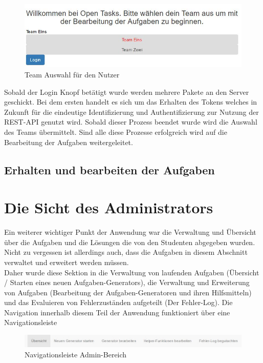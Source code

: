 \begin{figure}[htp]     %
\centering
\includegraphics[width=1\textwidth]{bilder/UserLogin} 
\caption[Login für den Nutzer / Teamauswahl]{Team Auswahl für den Nutzer}
\end{figure} 

Sobald der Login Knopf betätigt wurde werden mehrere Pakete an den Server geschickt. Bei dem ersten handelt es sich um das Erhalten des Tokens welches in Zukunft für die eindeutige Identifizierung und Authentifizierung zur Nutzung der REST-API genutzt wird. Sobald dieser Prozess beendet wurde wird die Auswahl des Teams übermittelt. Sind alle diese Prozesse erfolgreich wird auf die Bearbeitung der Aufgaben weitergeleitet. 

\subsection{Erhalten und bearbeiten der Aufgaben}



\section{Die Sicht des Administrators}

Ein weiterer wichtiger Punkt der Anwendung war die Verwaltung und Übersicht über die Aufgaben und die Lösungen die von den Studenten abgegeben wurden. Nicht zu vergessen ist allerdings auch, dass die Aufgaben in diesem Abschnitt verwaltet und erweitert werden müssen. \\
Daher wurde diese Sektion in die Verwaltung von laufenden Aufgaben (Übersicht / Starten eines neuen Aufgaben-Generators), die Verwaltung und Erweiterung von Aufgaben (Bearbeitung der Aufgaben-Generatoren und ihren Hilfsmitteln) und das Evaluieren von Fehlerzuständen aufgeteilt (Der Fehler-Log). Die Navigation innerhalb diesem Teil der Anwendung funktioniert über eine Navigationsleiste \\
\begin{figure}[htp]     %
\centering
\includegraphics[width=1\textwidth]{bilder/NavBar} 
\caption[Navigationsleiste Admin-Bereich]{Navigationsleiste Admin-Bereich}
\end{figure} 


